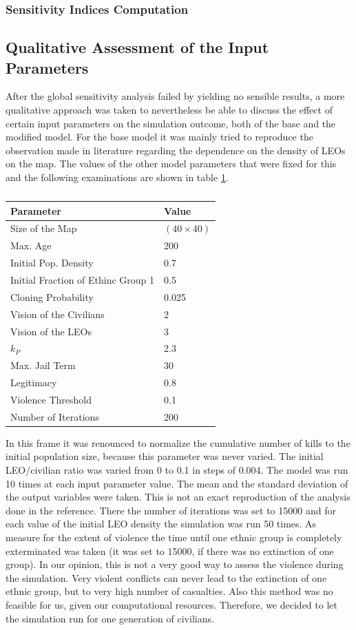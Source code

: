 \documentclass[11pt]{article}
\begin{document}
\subsubsection{Sensitivity Indices Computation}

\subsection{Qualitative Assessment of the Input Parameters}
After the global sensitivity analysis failed by yielding no sensible results, a more qualitative approach was taken to nevertheless be able to discuss the effect of certain input parameters on the simulation outcome, both of the base and the modified model. For the base model it was mainly tried to reproduce the observation made in literature regarding the dependence on the density of LEOs on the map. The values of the other model parameters that were fixed for this and the following examinations are shown in table \ref{tab:values_parameters}.
\begin{table}[!htbp]
	\centering
	\caption{}
	\vspace{0.5 cm}
		\begin{tabular}{l | l}
		Parameter & Value\\
		\hline
		Size of the Map & $(40 \times 40)$\\
		Max. Age & 200\\
		Initial Pop. Density & 0.7\\
		Initial Fraction of Ethinc Group 1 & 0.5\\
		Cloning Probability & 0.025\\
		Vision of the Civilians & 2\\
		Vision of the LEOs & 3\\
		$k_P$ & 2.3\\
		Max. Jail Term & 30\\
		Legitimacy & 0.8\\
		Violence Threshold & 0.1\\
		Number of Iterations & 200\\
	\end{tabular}
	\label{tab:values_parameters}
\end{table}
In this frame it was renounced to normalize the cumulative number of kills to the initial population size, because this parameter was never varied. The initial LEO/civilian ratio was varied from 0 to 0.1 in steps of 0.004. The model was run 10 times at each input parameter value. The mean and the standard deviation of the output variables were taken. This is not an exact reproduction of the analysis done in the reference. There the number of iterations was set to 15000 and for each value of the initial LEO density the simulation was run 50 times. As measure for the extent of violence the time until one ethnic group is completely exterminated was taken (it was set to 15000, if there was no extinction of one group). In our opinion, this is not a very good way to assess the violence during the simulation. Very violent conflicts can never lead to the extinction of one ethnic group, but to very high number of casualties. Also this method was no feasible for us, given our computational resources. Therefore, we decided to let the simulation run for one generation of civilians.\\
\end{document}
